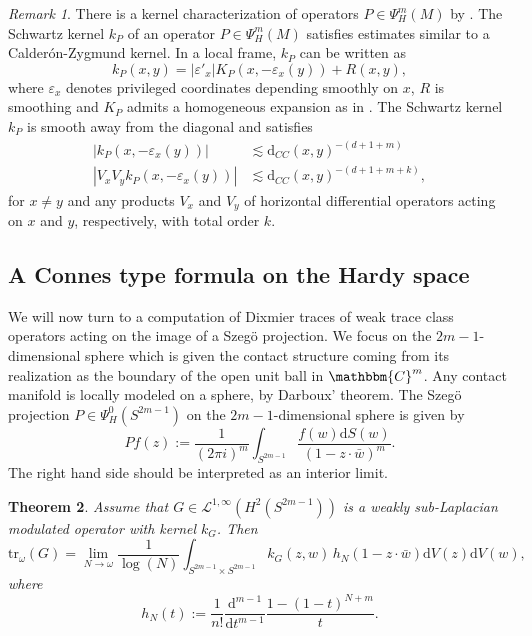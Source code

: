 \documentclass[10pt]{amsart}
\newtheorem{thm}{Theorem}[section]
\theoremstyle{remark}
\newtheorem{remark}[thm]{Remark}
\theoremstyle{definition}
\begin{document}
\begin{remark}
\label{PsiDOprop}
There is a kernel characterization of operators $P\in \Psi^m_H(M)$ by \cite[Proposition 3.1.16]{bg}. The Schwartz kernel $k_P$ of an operator $P \in  \Psi_H^{m}(M)$ satisfies estimates similar to a Calder\'{o}n-Zygmund kernel. In a local frame, $k_P$ can be written as
\[k_P(x,y)=|{\varepsilon}'_x|K_P(x,-{\varepsilon}_x(y))+R(x,y),\]
where ${\varepsilon}_x$ denotes privileged coordinates depending smoothly on $x$, $R$ is smoothing and $K_P$ admits a homogeneous expansion as in \cite[Definition 3.1.11 and 3.1.13]{bg}. The Schwartz kernel $k_P$ is smooth away from the diagonal and satisfies
\begin{align*}
|k_P(x,-{\varepsilon}_x(y))| &\lesssim {\mathrm{d}}_{CC}(x,y)^{-(d+1+m)}\\
|V_{x}V_y k_P(x,-{\varepsilon}_x(y))| &\lesssim {\mathrm{d}}_{CC}(x,y)^{-(d+1+m+k)},
\end{align*}
for $x \neq y$ and any products $V_x$ and $V_y$ of horizontal differential operators acting on $x$ and $y$, respectively, with total order $k$.
\end{remark}

\subsection{A Connes type formula on the Hardy space}
\label{sectionformerlyknownasthesectionformerlyknownas9}

We will now turn to a computation of Dixmier traces of weak trace class operators acting on the image of a Szeg\"o projection. We focus on the $2m-1$-dimensional sphere which is given the contact structure coming from its realization as the boundary of the open unit ball in ${\mathbbm{C}}^m$. Any contact manifold is locally modeled on a sphere, by Darboux' theorem. The Szeg\"o projection $P\in \Psi^0_H(S^{2m-1})$ on the $2m-1$-dimensional sphere is given by 
$$Pf(z):=\frac{1}{(2\pi i)^m}\int_{S^{2m-1}} \frac{f(w){\mathrm{d}} S(w)}{(1-z\cdot\bar{w})^m}.$$
The right hand side should be interpreted as an interior limit.

\begin{thm}
\label{contform}
Assume that $G\in \mathcal{L}^{1,\infty}(H^2(S^{2m-1}))$ is a weakly sub-Laplacian modulated operator with kernel $k_G$. Then 
$${\mathrm{t}\mathrm{r}}_\omega(G)=\lim_{N\to \omega} \frac{1}{\log(N)}\int_{S^{2m-1}\times S^{2m-1}} k_G(z,w)\,h_N(1-z\cdot \bar{w}){\mathrm{d}} V(z) {\mathrm{d}} V(w),$$
where
$$h_N(t):=\frac{1}{n!} \frac{{\mathrm{d}}^{m-1}}{{\mathrm{d}} t^{m-1}} \frac{1-(1-t)^{N+m}}{t}.$$
\end{thm}
\end{document}
